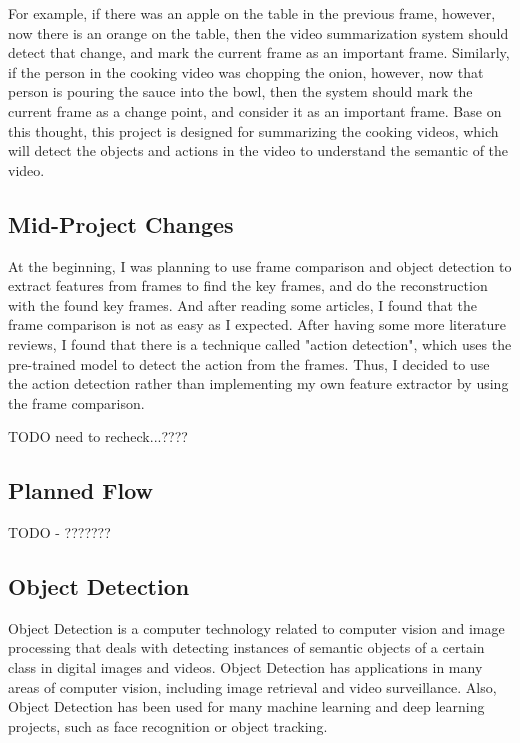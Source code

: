 \documentclass{article}
\begin{document}
For example, if there was an apple on the table in the previous frame, however, now there is an orange on the table, then the video summarization system should detect that change, and mark the current frame as an important frame. Similarly, if the person in the cooking video was chopping the onion, however, now that person is pouring the sauce into the bowl, then the system should mark the current frame as a change point, and consider it as an important frame. Base on this thought, this project is designed for summarizing the cooking videos, which will detect the objects and actions in the video to understand the semantic of the video.

\subsection{Mid-Project Changes}

At the beginning, I was planning to use frame comparison and object detection to extract features from frames to find the key frames, and do the reconstruction with the found key frames. And after reading some articles, I found that the frame comparison is not as easy as I expected. After having some more literature reviews, I found that there is a technique called "action detection", which uses the pre-trained model to detect the action from the frames. Thus, I decided to use the action detection rather than implementing my own feature extractor by using the frame comparison.

TODO need to recheck...????

\subsection{Planned Flow}

TODO - ???????

\subsection{Object Detection}

Object Detection is a computer technology related to computer vision and image processing that deals with detecting instances of semantic objects of a certain class in digital images and videos. Object Detection has applications in many areas of computer vision, including image retrieval and video surveillance. Also, Object Detection has been used for many machine learning and deep learning projects, such as face recognition or object tracking.
\end{document}
